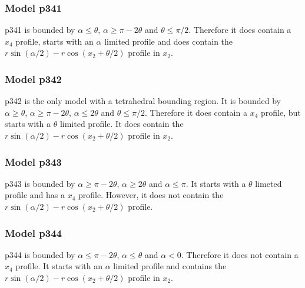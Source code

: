\subsubsection{Model p341} \label{p341}

p341 is bounded by $\alpha \le \theta$, $\alpha \ge \pi - 2\theta$ and $\theta \le \pi/2$. Therefore it does contain a $x_4$ profile, starts with an $\alpha$ limited profile and does contain the $r\sin(\alpha/2) - r\cos(x_2 + \theta/2)$ profile in $x_2$.



\subsubsection{Model p342} \label{p342}

p342 is the only model with a tetrahedral bounding region. It is bounded by $\alpha \ge \theta$, $\alpha \ge \pi - 2\theta$, $\alpha \le 2\theta$ and $\theta \le \pi/2$. Therefore it does contain a $x_4$ profile, but starts with a $\theta$ limited profile. It does contain the $r\sin(\alpha/2) - r\cos(x_2 + \theta/2)$ profile in $x_2$.



\subsubsection{Model p343} \label{p343}

p343 is bounded by $\alpha \ge \pi - 2\theta$,  $\alpha \ge 2\theta$ and $\alpha \le \pi$. It starts with a $\theta$ limeted profile and has a $x_4$ profile. However, it does not contain the $r\sin(\alpha/2) - r\cos(x_2 + \theta/2)$ profile.




\subsubsection{Model p344} \label{p344}

p344 is bounded by $\alpha \le \pi - 2\theta$, $\alpha \le \theta$ and $\alpha < 0$. Therefore it does not contain a $x_4$ profile. It starts with an $\alpha$ limited profile and contains the $r\sin(\alpha/2) - r\cos(x_2 + \theta/2)$ profile in $x_2$.





